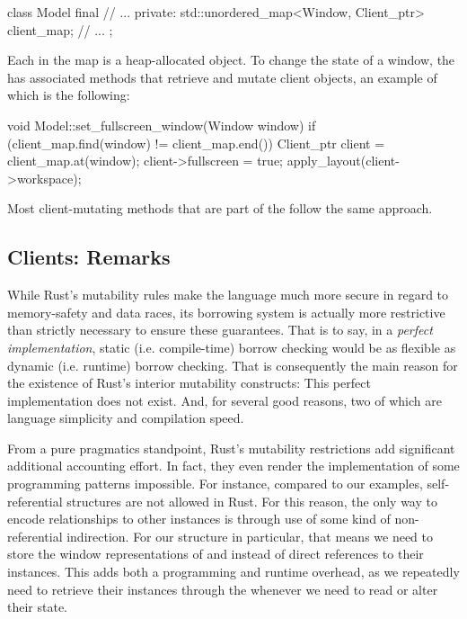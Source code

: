 \begin{cppblock}
  class Model final
  {
    // ...
  private:
    std::unordered_map<Window, Client_ptr> client_map;
    // ...
  };
\end{cppblock}

Each  in the map is a heap-allocated object. To change the
state of a window, the  has associated methods that retrieve and
mutate client objects, an example of which is the following:

\begin{cppblock}
  void
  Model::set_fullscreen_window(Window window)
  {
    if (client_map.find(window) != client_map.end()) {
      Client_ptr client = client_map.at(window);
      client->fullscreen = true;
      apply_layout(client->workspace);
    }
  }
\end{cppblock}

Most client-mutating methods that are part of the  follow the same
approach.

\subsection{Clients: Remarks}

While Rust's mutability rules make the language much more secure in regard to
memory-safety and data races, its borrowing system is actually more restrictive
than strictly necessary to ensure these guarantees. That is to say, in a
\textit{perfect implementation}, static (i.e. compile-time) borrow checking
would be as flexible as dynamic (i.e. runtime) borrow checking. That is
consequently the main reason for the existence of Rust's interior mutability
constructs: This perfect implementation does not exist. And, for several good
reasons, two of which are language simplicity and compilation speed.

From a pure pragmatics standpoint, Rust's mutability restrictions add
significant additional accounting effort. In fact, they even render the
implementation of some programming patterns impossible. For instance, compared
to our \cpp examples, self-referential structures are not allowed in Rust.
For this reason, the only way to encode relationships to other instances is
through use of some kind of non-referential indirection. For our 
structure in particular, that means we need to store the window representations
of  and  instead of direct references to their
 instances. This adds both a programming and runtime overhead, as
we repeatedly need to retrieve their instances through the 
whenever we need to read or alter their state.



